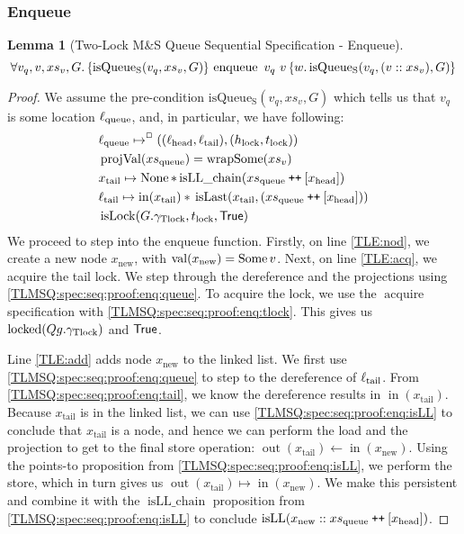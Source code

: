 \documentclass[a4paper, 10pt]{report}
\theoremstyle{definition}
\newtheorem{lemma}[theorem]{Lemma}
\newcommand{\isLock}{\operatorname{isLock}}
\newcommand{\locked}{\operatorname{locked}}
\newcommand{\acquire}{\operatorname{acquire}}
\newcommand{\enqueue}{\operatorname{enqueue}}
\newcommand{\msq}{M\&S Queue}
\newcommand{\tlmsq}{Two-Lock \msq{}}
\newcommand{\isqueueseq}{\operatorname{isQueue_{S}}}
\newcommand{\vq}{v_q}
\newcommand{\xsqueue}{xs_{\mathrm{queue}}}
\newcommand{\isLLchain}{\operatorname{isLL\_chain}}
\newcommand{\isLL}{\operatorname{isLL}}
\newcommand{\projval}{\operatorname{projVal}}
\newcommand{\wrapsome}{\operatorname{wrapSome}}
\newcommand{\isLast}{\operatorname{isLast}}
\newcommand{\locN}[1]{\loc_{\mathrm{#1}}}
\newcommand{\lochead}{\locN{head}}
\newcommand{\loctail}{\locN{tail}}
\newcommand{\locqueue}{\locN{queue}}
\newcommand{\nIn}[1]{\operatorname{in}(#1)}
\newcommand{\nVal}[1]{\operatorname{val}(#1)}
\newcommand{\nOut}[1]{\operatorname{out}(#1)}
\newcommand{\node}{x}
\newcommand{\nodeN}[1]{\node_{\mathrm{#1}}}
\newcommand{\nodehead}{\nodeN{head}}
\newcommand{\nodetail}{\nodeN{tail}}
\newcommand{\nodenew}{\nodeN{new}}
\newcommand{\absvalue}{\val}
\newcommand{\absvalueList}{xs_v}
\newcommand{\Hlock}{h_{\mathrm{lock}}}
\newcommand{\Tlock}{t_{\mathrm{lock}}}
\newcommand{\Qg}{G}
\newcommand{\gtlock}{\gname_{\mathrm{Tlock}}}
\newcommand\catenate{\mathbin{\text{\ttfamily\upshape ++}}}
\newcommand{\seqspecenqHT}[4]{\hoare{\isqueueseq(#1, #3, #4)}{\enqueue \ #1 \ #2}{\valB . \isqueueseq(#1, (#2 :: #3), #4)}}
\newcommand{\seqspecenqGen}[4]{\All #1, #2, #3, #4. \seqspecenqHT{#1}{#2}{#3}{#4}}
\newcommand{\seqspecenq}{\seqspecenqGen{\vq}{\absvalue}{\absvalueList}{\Qg}}
\begin{document}
\subsubsection{Enqueue}
\begin{lemma}[\tlmsq{} Sequential Specification - Enqueue]\label{TLMSQ:spec:seq:enqueue}
  \begin{equation*}
    \seqspecenq
  \end{equation*}
\end{lemma}
\begin{proof}
We assume the pre-condition $\isqueueseq(\vq, \absvalueList, \Qg)$ which tells us that $\vq$ is some location $\locqueue$, and, in particular, we have following:
\begin{align}
  &\locqueue \mapsto^{\persistently} ((\lochead, \loctail), (\Hlock, \Tlock))\label{TLMSQ:spec:seq:proof:enq:queue}\\
  &\projval(\xsqueue) = \wrapsome(\absvalueList)\label{TLMSQ:spec:seq:proof:enq:rel}\\
  &\nodetail \mapsto \None \star{} \isLLchain (\xsqueue \catenate [\nodehead])\label{TLMSQ:spec:seq:proof:enq:isLL}\\
  &\loctail \mapsto \nIn{\nodetail} \star{} \isLast(\nodetail, (\xsqueue \catenate [\nodehead]))\label{TLMSQ:spec:seq:proof:enq:tail}\\
  &\isLock(\Qg.\gtlock, \Tlock, \TRUE)\label{TLMSQ:spec:seq:proof:enq:tlock}
\end{align}
We proceed to step into the enqueue function. Firstly, on line \ref{TLE:nod}, we create a new node $\nodenew$, with $\nVal{\nodenew} = \Some \absvalue$. Next, on line \ref{TLE:acq}, we acquire the tail lock. We step through the dereference and the projections using \ref{TLMSQ:spec:seq:proof:enq:queue}. To acquire the lock, we use the $\acquire$ specification with \ref{TLMSQ:spec:seq:proof:enq:tlock}. This gives us $\locked(Qg.\gtlock)$ and $\textsf{True}$.

Line \ref{TLE:add} adds node $\nodenew$ to the linked list. We first use \ref{TLMSQ:spec:seq:proof:enq:queue} to step to the dereference of $\loctail$. From \ref{TLMSQ:spec:seq:proof:enq:tail}, we know the dereference results in $\nIn{\nodetail}$. Because $\nodetail$ is in the linked list, we can use \ref{TLMSQ:spec:seq:proof:enq:isLL} to conclude that $\nodetail$ is a node, and hence we can perform the load and the projection to get to the final store operation: $\nOut{\nodetail} \gets \nIn{\nodenew}$. Using the points-to proposition from \ref{TLMSQ:spec:seq:proof:enq:isLL}, we perform the store, which in turn gives us $\nOut{\nodetail} \mapsto \nIn{\nodenew}$. We make this persistent and combine it with the $\isLLchain$ proposition from \ref{TLMSQ:spec:seq:proof:enq:isLL} to conclude $\isLL(\nodenew :: \xsqueue \catenate [\nodehead])$.


\end{proof}
\end{document}
